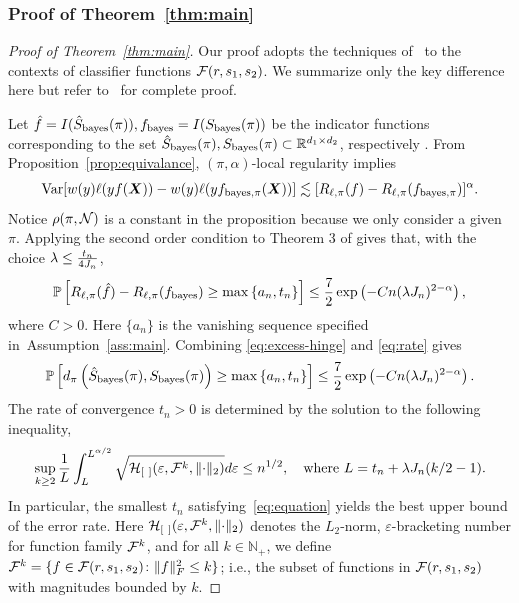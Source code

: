 \documentclass[11pt]{article}
\theoremstyle{plain}
\theoremstyle{definition}
\def\bayesf{f_{\textup{bayes}}}
\def\bayesS{S_{\textup{bayes}}}
\def\bayespif{f_{\textup{bayes},\pi}}
\begin{document}
\subsubsection{Proof of Theorem~\ref{thm:main}}
\begin{proof}[Proof of Theorem~\ref{thm:main}]
Our proof adopts the techniques of~\citet[Theorem 3]{wang2008probability} to the contexts of classifier functions $\mathcal{F}(r,s_1,s_2)$. We summarize only the key difference here but refer to~\cite{wang2008probability} for complete proof. 

Let $\hat f = I(\hat S_{\text{bayes}}(\pi)),\bayesf = I(\bayesS(\pi))$ be the indicator functions corresponding to the set $\hat S_{\text{bayes}}(\pi),\bayesS(\pi)\subset \mathbb{R}^{d_1\times d_2}$, respectively .
From Proposition~\ref{prop:equivalance},  $(\pi,\alpha)$-local regularity implies 
\begin{align}
\text{Var}[w(y)\ell(yf(\mX))-w(y)\ell(y\bayespif(\mX))]\lesssim [R_{\ell,\pi}(f)-R_{\ell,\pi}(\bayespif)]^\alpha.
\end{align}
Notice $\rho(\pi,\mathcal{N})$ is a constant in the proposition because we only consider a given $\pi$.
Applying the second order condition to Theorem 3 of \cite{wang2008probability} gives that, with the choice $\lambda\leq {t_n\over 4J_n}$, 
\begin{equation}\label{eq:rate}
\mathbb{P}\left[R_{\ell,\pi}(\hat f)-R_{\ell,\pi}(\bayesf)\geq \max\left\{a_n, t_n\right\}\right]\leq {7\over 2}\exp\left( -Cn(\lambda J_n)^{2-\alpha}\right), 
\end{equation}
where $C>0$. Here $\{a_n\}$ is the vanishing sequence specified in~Assumption~\ref{ass:main}. Combining \eqref{eq:excess-hinge} and \eqref{eq:rate} gives
\begin{equation}
\mathbb{P}\left[d_\pi\left(\hat S_{\text{bayes}}(\pi),\bayesS(\pi)\right)\geq \max\left\{a_n, t_n\right\}\right]\leq {7\over 2}\exp\left( -Cn(\lambda J_n)^{2-\alpha}\right).
\end{equation}
The rate of convergence $t_n>0$ is determined by the solution to the following inequality,
\begin{equation}\label{eq:equation}
\sup_{k\geq 2}{1\over L}\int_{L}^{L^{\alpha/2}}\sqrt{\tH_{[\ ]}(\varepsilon, \tF^{k},\vnormSize{}{\cdot})}d\varepsilon \leq n^{1/2}, \quad \text{where }L=t_n+\lambda J_n(k/2-1).
\end{equation}
In particular, the smallest $t_n$ satisfying~\eqref{eq:equation} yields the best upper bound of the error rate. Here $\tH_{[\ ]}(\varepsilon, \tF^{k}, \vnormSize{}{\cdot})$ denotes the $L_2$-norm, $\varepsilon$-bracketing number for function family $\mathcal{F}^{k}$, and for all $k\in \mathbb{N}_{+}$, we define $\mathcal{F}^{k}=\{f\in\mathcal{F}(r,s_1,s_2)\colon \lVert f\rVert_F^2\leq k\}$; i.e., the subset of functions in $\mathcal{F}(r,s_1,s_2)$ with magnitudes bounded by $k$. 


\end{proof}
\end{document}
